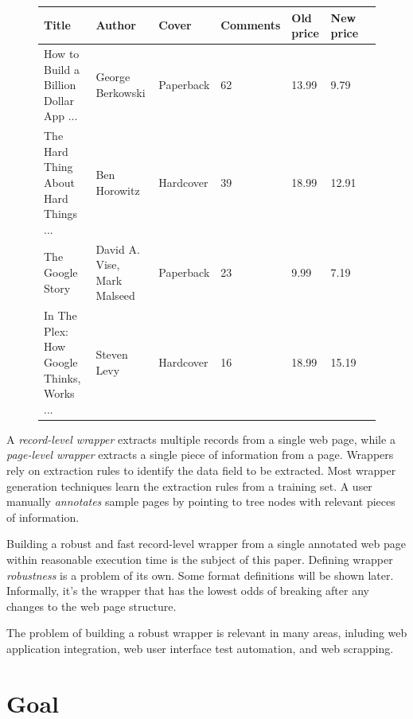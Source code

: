 \begin{figure}
	\centering
    \begin{tabularx}{\textwidth}{ | l | l | l | l | l | l | p{5cm} |}
		\hline
		\textbf{Title} & \textbf{Author} & \textbf{Cover} & \textbf{Comments} & \textbf{Old price} & \textbf{New price} \\ 
		\hline
		How to Build a Billion Dollar App ... & George Berkowski & Paperback & 62 & 13.99 & 9.79 \\ 
		\hline
		The Hard Thing About Hard Things ... & Ben Horowitz & Hardcover & 39 & 18.99 & 12.91 \\ 
		\hline
		The Google Story & David A. Vise, Mark Malseed & Paperback & 23 & 9.99 & 7.19 \\ 
		\hline
		In The Plex: How Google Thinks, Works ... & Steven Levy & Hardcover & 16 & 18.99 & 15.19 \\ 
		\hline
    \end{tabularx}
\end{figure}

A \emph{record-level wrapper} extracts multiple records from a single web page, while a \emph{page-level wrapper} extracts a single piece of information from a page. Wrappers rely on extraction rules to identify the data field to be extracted. Most wrapper generation techniques learn the extraction rules from a training set. A user manually \emph{annotates} sample pages by pointing to tree nodes with relevant pieces of information.

Building a robust and fast record-level wrapper from a single annotated web page within reasonable execution time is the subject of this paper. Defining wrapper \emph{robustness} is a problem of its own. Some format definitions will be shown later. Informally, it's the wrapper that has the lowest odds of breaking after any changes to the web page structure.

The problem of building a robust wrapper is relevant in many areas, inluding web application integration, web user interface test automation, and web scrapping.


\section{Goal}


